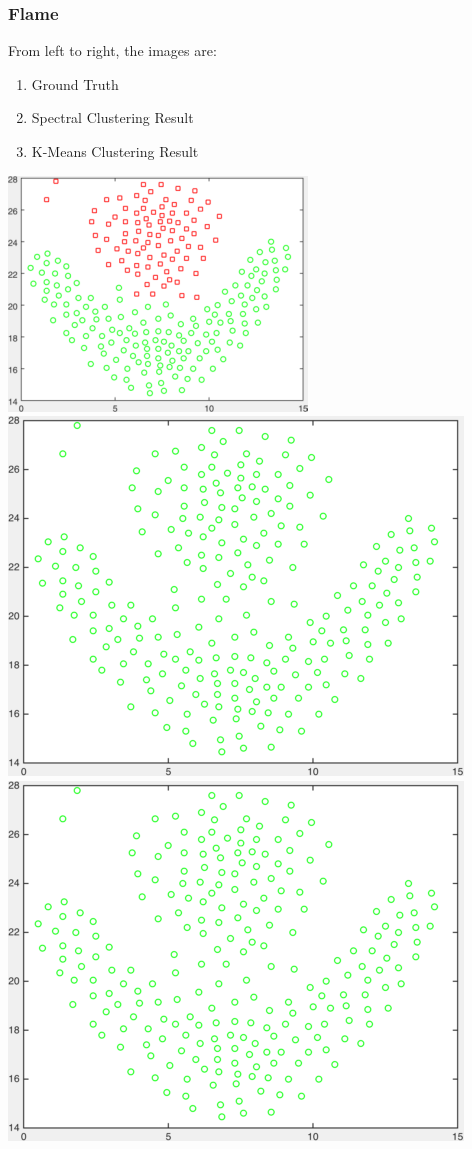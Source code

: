 \documentclass[11pt]{article}
\begin{document}
\subsubsection*{Flame} 
From left to right, the images are:
\begin{enumerate}
\item Ground Truth
\item Spectral Clustering Result
\item K-Means Clustering Result
\end{enumerate}
\begin{center}
\includegraphics[scale=0.5]{flame} \ 
\includegraphics[scale=0.25]{results_spectral_flame} \ 
\includegraphics[scale=0.25]{results_kmeans_flame}
\end{center}
\end{document}
